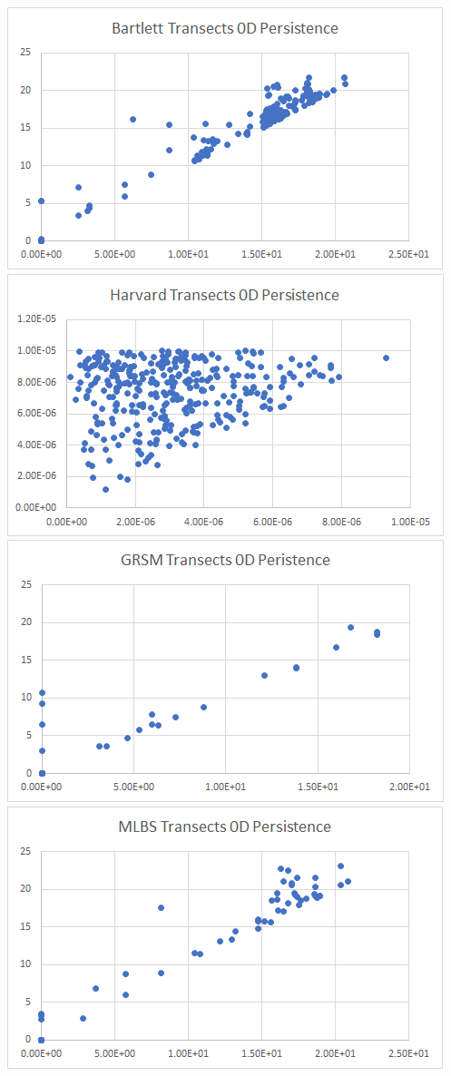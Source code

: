 \documentclass[10pt]{article}
\begin{document}
\includegraphics[scale = 0.05]{bartlett_transects_0d_persistence}\\
\includegraphics[scale = 0.05]{harvard_transects_0d_persistence}\\
\includegraphics[scale = 0.05]{grsm_transects_0d_persistence}\\
\includegraphics[scale = 0.05]{mlbs_transects_0d_persistence}\\
\end{document}
